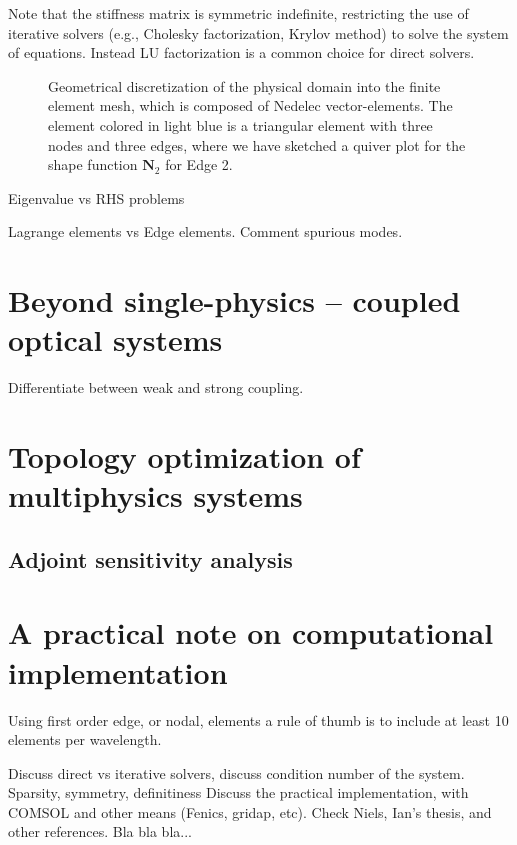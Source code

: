 Note that the stiffness matrix is symmetric indefinite, restricting the use of iterative solvers (e.g., Cholesky factorization, Krylov method) to solve the system of equations. Instead LU factorization is a common choice for direct solvers.
\begin{figure}[tb]
    \centering
    \caption{Geometrical discretization of the physical domain into the finite element mesh, which is composed of Nedelec vector-elements. The element colored in light blue is a triangular element with three nodes and three edges, where we have sketched a quiver plot for the shape function $\mathbf{N}_2$ for Edge 2.}
    \label{fig:fem}
\end{figure}

Eigenvalue vs RHS problems


Lagrange elements vs Edge elements. Comment spurious modes.

\section{Beyond single-physics -- coupled optical systems}

Differentiate between weak and strong coupling.

\section{Topology optimization of multiphysics systems}

\subsection{Adjoint sensitivity analysis}

\section{A practical note on computational implementation}

Using first order edge, or nodal, elements a rule of thumb is to include at least 10 elements per wavelength.

Discuss direct vs iterative solvers, discuss condition number of the system.
Sparsity, symmetry, definitiness
Discuss the practical implementation, with COMSOL and other means (Fenics, gridap, etc).
Check Niels, Ian's thesis, and other references.
Bla bla bla...